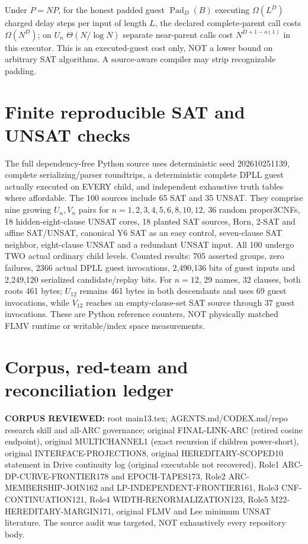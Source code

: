 \documentclass[11pt]{article}
\begin{document}
Under $P=NP$, for the honest padded guest $\operatorname{Pad}_D(B)$ executing $\Omega(L^D)$ charged delay steps per input of length $L$, the declared complete-parent call costs $\Omega(N^D)$; on $U_n$ $\Theta(N/\log N)$ separate near-parent calls cost $N^{D+1-o(1)}$ in this executor. This is an executed-guest cost only, NOT a lower bound on arbitrary SAT algorithms. A source-aware compiler may strip recognizable padding.

\section*{Finite reproducible SAT and UNSAT checks}
The full dependency-free Python source uses deterministic seed 202610251139, complete serializing/parser roundtrips, a deterministic complete DPLL guest actually executed on EVERY child, and independent exhaustive truth tables where affordable. The 100 sources include 65 SAT and 35 UNSAT. They comprise nine growing $U_n,V_n$ pairs for $n=1,2,3,4,5,6,8,10,12$, 36 random proper3CNFs, 18 hidden-eight-clause UNSAT cores, 18 planted SAT sources, Horn, 2-SAT and affine SAT/UNSAT, canonical Y6 SAT as an easy control, seven-clause SAT neighbor, eight-clause UNSAT and a redundant UNSAT input. All 100 undergo TWO actual ordinary child levels. Counted results: 705 asserted groups, zero failures, 2366 actual DPLL guest invocations, 2,490,136 bits of guest inputs and 2,249,120 serialized candidate/replay bits. For $n=12$, 29 names, 32 clauses, both roots 461 bytes; $U_{12}$ remains 461 bytes in both descendants and uses 69 guest invocations, while $V_{12}$ reaches an empty-clause-set SAT source through 37 guest invocations. These are Python reference counters, NOT physically matched FLMV runtime or writable/index space measurements.

\section*{Corpus, red-team and reconciliation ledger}
\textbf{CORPUS REVIEWED:} root main13.tex; AGENTS.md/CODEX.md/repo research skill and all-ARC governance; original FINAL-LINK-ARC (retired cosine endpoint), original MULTICHANNEL1 (exact recursion if children power-short), original INTERFACE-PROJECTION8, original HEREDITARY-SCOPED10 statement in Drive continuity log (original executable not recovered), Role1 ARC-DP-CURVE-FRONTIER178 and EPOCH-TAPES173, Role2 ARC-MEMBERSHIP-JOIN162 and LP-INDEPENDENT-FRONTIER161, Role3 CNF-CONTINUATION121, Role4 WIDTH-RENORMALIZATION123, Role5 M22-HEREDITARY-MARGIN171, original FLMV and Lee minimum UNSAT literature. The source audit was targeted, NOT exhaustively every repository body.
\end{document}
